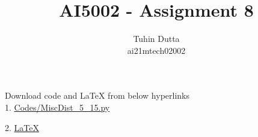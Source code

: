 \documentclass[journal,12pt,twocolumn]{IEEEtran}
\begin{document}
\providecommand{\mtx}[1]{\mathbf{#1}}
\providecommand{\fourier}{\overset{\mathcal{F}}{ \rightleftharpoons}}
\providecommand{\system}{\overset{\mathcal{H}}{ \longleftrightarrow}}
\newcommand{\solution}{\noindent \textbf{Solution: }}
\newcommand{\cosec}{\,\text{cosec}\,}
\providecommand{\dec}[2]{\ensuremath{\overset{#1}{\underset{#2}{\gtrless}}}}
\newcommand{\myvec}[1]{\ensuremath{\begin{pmatrix}#1\end{pmatrix}}}
\newcommand{\mydet}[1]{\ensuremath{\begin{vmatrix}#1\end{vmatrix}}}
\makeatletter
{}
\makeatother
\let\StandardTheFigure\thefigure
\let\vec\mathbf
\renewcommand{\thefigure}{\theproblem}
\def\putbox#1#2#3{\makebox[0in][l]{\makebox[#1][l]{}\raisebox{\baselineskip}[0in][0in]{\raisebox{#2}[0in][0in]{#3}}}}
     \def\rightbox#1{\makebox[0in][r]{#1}}
     \def\centbox#1{\makebox[0in]{#1}}
     \def\topbox#1{\raisebox{-\baselineskip}[0in][0in]{#1}}
     \def\midbox#1{\raisebox{-0.5\baselineskip}[0in][0in]{#1}}
\vspace{3cm}
\title{AI5002 - Assignment 8}
\author{Tuhin Dutta\\ ai21mtech02002}
\maketitle
\newpage
\bigskip
\renewcommand{\thefigure}{\theenumi}
\renewcommand{\thetable}{\theenumi}
\begin{mdframed}
Download code and LaTeX from below hyperlinks\\
1. \href{https://github.com/Tauhait/AI5002/blob/main/Assignment-8/Codes/MiscDist\_5\_15.py}{Codes/MiscDist\_5\_15.py}


2. \href{https://github.com/Tauhait/AI5002/tree/main/Assignment-8/LaTeX}{LaTeX}
\end{mdframed}
\end{document}
